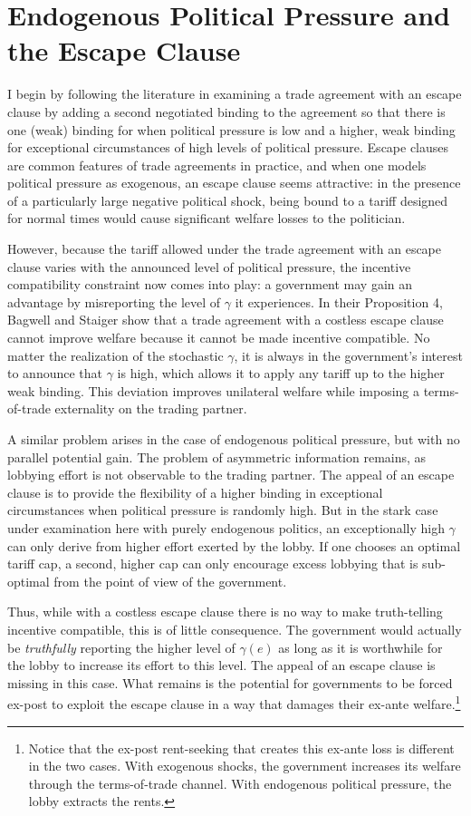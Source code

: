 \documentclass[12pt]{article}
\newcommand{\ga}{\gamma}
\begin{document}
\section{Endogenous Political Pressure and the Escape Clause}
\label{sec:escape}
I begin by following the literature in examining a trade agreement with an escape clause by adding a second negotiated binding to the agreement so that there is one (weak) binding for when political pressure is low and a higher, weak binding for exceptional circumstances of high levels of political pressure. Escape clauses are common features of trade agreements in practice, and when one models political pressure as exogenous, an escape clause seems attractive: in the presence of a particularly large negative political shock, being bound to a tariff designed for normal times would cause significant welfare losses to the politician.

However, because the tariff allowed under the trade agreement with an escape clause varies with the announced level of political pressure, the incentive compatibility constraint now comes into play: a government may gain an advantage by misreporting the level of $\ga$ it experiences. In their Proposition 4, Bagwell and Staiger show that a trade agreement with a costless escape clause cannot improve welfare because it cannot be made incentive compatible. No matter the realization of the stochastic $\ga$, it is always in the government's interest to announce that $\ga$ is high, which allows it to apply any tariff up to the higher weak binding. This deviation improves unilateral welfare while imposing a terms-of-trade externality on the trading partner.

A similar problem arises in the case of endogenous political pressure, but with no parallel potential gain. The problem of asymmetric information remains, as lobbying effort is not observable to the trading partner. The appeal of an escape clause is to provide the flexibility of a higher binding in exceptional circumstances when political pressure is randomly high. But in the stark case under examination here with purely endogenous politics, an exceptionally high $\ga$ can only derive from higher effort exerted by the lobby. If one chooses an optimal tariff cap, a second, higher cap can only encourage excess lobbying that is sub-optimal from the point of view of the government.

Thus, while with a costless escape clause there is no way to make truth-telling incentive compatible, this is of little consequence. The government would actually be \textit{truthfully} reporting the higher level of $\ga(e)$ as long as it is worthwhile for the lobby to increase its effort to this level. The appeal of an escape clause is missing in this case. What remains is the potential for governments to be forced ex-post to exploit the escape clause in a way that damages their ex-ante welfare.\footnote{Notice that the ex-post rent-seeking that creates this ex-ante loss is different in the two cases. With exogenous shocks, the government increases its welfare through the terms-of-trade channel. With endogenous political pressure, the lobby extracts the rents.}
\end{document}
